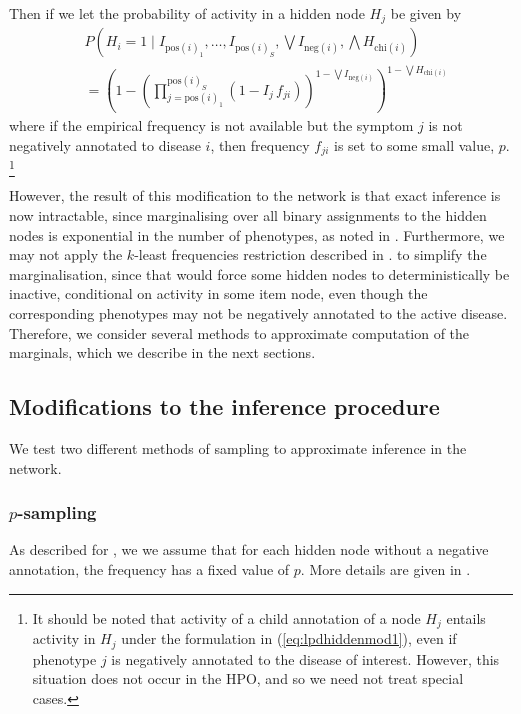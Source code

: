 Then if we let the probability of activity in a hidden node $H_j$ be given by
\begin{align}\label{eq:lpdhiddenmod1}
    &P\left(H_i = 1 \mid I_{\text{pos}(i)_1}, \hdots, I_{\text{pos}(i)_S},
    \bigvee I_{\text{neg}(i)}, \bigwedge H_{\text{chi}(i)}\right)\nonumber\\
        &= \left(
            1 - 
            \left(
                \prod_{j=\text{pos}(i)_1}^{\text{pos}(i)_S}
                \left(1 - I_j \, f_{ji}\right)
            \right) ^{1 - \bigvee I_{\text{neg}(i)}}
        \right)
        ^{1 - \bigvee H_{\text{chi}(i)}}
\end{align}
where if the empirical frequency is not available but the symptom $j$ is not
negatively annotated to disease $i$, then frequency $f_{ji}$ is set to some
small value, $p$.
%
\footnote{It should be noted that activity of a child annotation of a node
    $H_j$ entails activity in $H_j$ under the formulation in
    (\ref{eq:lpdhiddenmod1}), even if phenotype $j$ is negatively annotated
    to the disease of interest. However, this situation does not occur in the
    HPO, and so we need not treat special cases.
}

However, the result of this modification to the network is that exact inference
is now intractable, since marginalising over all binary assignments to the
hidden nodes is exponential in the number of phenotypes,
as noted in . 
%
Furthermore, we may not apply the $k$-least frequencies restriction 
described in . 
to simplify the marginalisation, since that would force some hidden nodes to
deterministically be inactive, conditional on activity in
some item node, even though the corresponding phenotypes  may not be negatively
annotated to the active disease.
%
Therefore, we consider several methods to approximate computation of the
marginals, which we describe in the next sections.

\subsection{Modifications to the inference procedure}
\label{subsec:modinf}

We test two different methods of sampling to approximate inference in the
network.

\subsubsection{$p$-sampling}
\label{subsubsec:psampmodel}
%
As described for , we
we assume that for each hidden node without a negative annotation, the frequency
has a fixed value of $p$. 
%
More details are given in .

